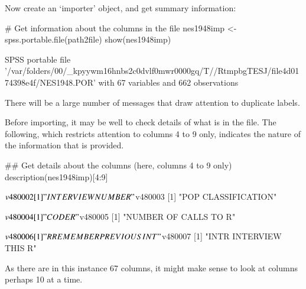 Now create an `importer' object, and get summary information:
\begin{fullwidth}
\begin{Schunk}
\begin{Sinput}
# Get information about the columns in the file
nes1948imp <- spss.portable.file(path2file)
show(nes1948imp)
\end{Sinput}
\end{Schunk}
\footnotesize
\begin{Schunk}
\begin{Soutput}

SPSS portable file '/var/folders/00/_kpyywm16hnbs2c0dvlf0mwr0000gq/T//RtmpbgTESJ/file4d0174398e4f/NES1948.POR' 
	with 67 variables and 662 observations
\end{Soutput}
\end{Schunk}
\end{fullwidth}
There will be a large number of messages that draw attention to
duplicate labels.

  Before importing, it may be well to check details of
what is in the file. The following, which restricts attention to
columns 4 to 9 only, indicates the nature of the information that is
provided.
\begin{fullwidth}
\begin{Schunk}
\begin{Sinput}
## Get details about the columns (here, columns 4 to 9 only)
description(nes1948imp)[4:9]
\end{Sinput}
\end{Schunk}

\begin{Schunk}
\begin{Soutput}
$v480002
[1] "INTERVIEW NUMBER"

$v480003
[1] "POP CLASSIFICATION"

$v480004
[1] "CODER"

$v480005
[1] "NUMBER OF CALLS TO R"

$v480006
[1] "R REMEMBER PREVIOUS INT"

$v480007
[1] "INTR INTERVIEW THIS R"
\end{Soutput}
\end{Schunk}
\end{fullwidth}
\noindent
As there are in this instance 67 columns, it might make sense to look
at columns perhaps 10 at a time.

